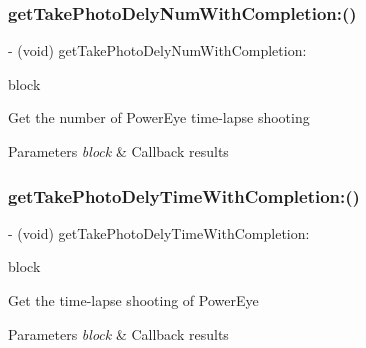 \subsubsection{\texorpdfstring{get\+Take\+Photo\+Dely\+Num\+With\+Completion\+:()}{getTakePhotoDelyNumWithCompletion:()}}
{\footnotesize\ttfamily -\/ (void) get\+Take\+Photo\+Dely\+Num\+With\+Completion\+: \begin{DoxyParamCaption}\item[{(void($^\wedge$)(N\+S\+Integer num, N\+S\+Error $\ast$\hyperlink{group___p_v_s_d_k___c_o_r_e___a_p_i___m_o_u_n_t_c_o_n_t_r_o_l_ga5a1de33b230662127568783314b4a54d}{\+\_\+\+Nullable} error))}]{block }\end{DoxyParamCaption}}

Get the number of Power\+Eye time-\/lapse shooting


\begin{DoxyParams}{Parameters}
{\em block} & Callback results \\
\hline
\end{DoxyParams}
\mbox{\label{interface_p_v_camera_a1eb89b76d160e7445e6f31f4bdfb3e44}} 
\subsubsection{\texorpdfstring{get\+Take\+Photo\+Dely\+Time\+With\+Completion\+:()}{getTakePhotoDelyTimeWithCompletion:()}}
{\footnotesize\ttfamily -\/ (void) get\+Take\+Photo\+Dely\+Time\+With\+Completion\+: \begin{DoxyParamCaption}\item[{(void($^\wedge$)(N\+S\+Integer time, N\+S\+Error $\ast$\hyperlink{group___p_v_s_d_k___c_o_r_e___a_p_i___m_o_u_n_t_c_o_n_t_r_o_l_ga5a1de33b230662127568783314b4a54d}{\+\_\+\+Nullable} error))}]{block }\end{DoxyParamCaption}}

Get the time-\/lapse shooting of Power\+Eye


\begin{DoxyParams}{Parameters}
{\em block} & Callback results \\
\hline
\end{DoxyParams}
\mbox{\label{interface_p_v_camera_a15af755b1d1134416671cd684ecab824}} 
